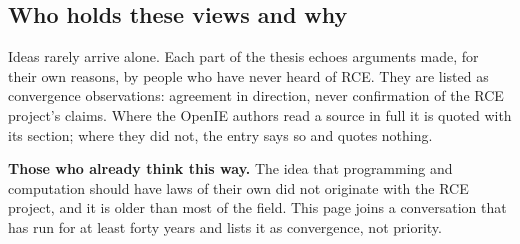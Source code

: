 \documentclass[10pt,letterpaper]{article}
\begin{document}
\subsection{Who holds these views and
why}\label{who-holds-these-views-and-why}

Ideas rarely arrive alone. Each part of the thesis echoes arguments
made, for their own reasons, by people who have never heard of RCE. They
are listed as convergence observations: agreement in direction, never
confirmation of the RCE project's claims. Where the OpenIE authors read
a source in full it is quoted with its section; where they did not, the
entry says so and quotes nothing.

\textbf{Those who already think this way.} The idea that programming and
computation should have laws of their own did not originate with the RCE
project, and it is older than most of the field. This page joins a
conversation that has run for at least forty years and lists it as
convergence, not priority.
\end{document}
